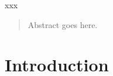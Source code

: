 \documentclass{iucr}              %
\begin{document}
\maketitle                        %

\begin{synopsis}
xxx
\end{synopsis}

\begin{abstract}
Abstract goes here.
\end{abstract}



\section{Introduction}
\end{document}
